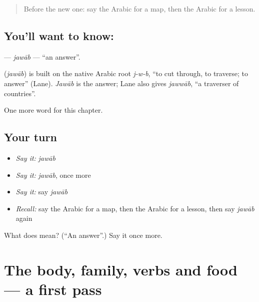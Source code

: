 \label{lesson:AR-C74-jawab}



\begin{quote}
Before the new one: say the Arabic for a map, then the Arabic for a lesson.
\end{quote}

\subsection*{You'll want to know: }
\textbf{} — \emph{jawāb} — \textquotedblleft{}an answer\textquotedblright{}.

\begin{cousinweb}
\textbf{} (\emph{jawāb}) is built on the native Arabic root \emph{j-w-b}, \textquotedblleft{}to cut through, to traverse; to answer\textquotedblright{} (Lane). \emph{Jawāb} is the answer; Lane also gives \emph{jawwāb}, \textquotedblleft{}a traverser of countries\textquotedblright{}.
\end{cousinweb}

\begin{grammarlens}[title={What you've built}]
One more word for this chapter.
\end{grammarlens}

\subsection*{Your turn}
\begin{itemize}
\raggedright
  \item \emph{Say it:} \emph{jawāb}
  \item \emph{Say it:} \emph{jawāb}, once more
  \item \emph{Say it:} say \emph{jawāb}
  \item \emph{Recall:} say the Arabic for a map, then the Arabic for a lesson, then say \emph{jawāb} again
\end{itemize}

\begin{tcolorbox}[breakable,colback=teal!4,colframe=teal!35!black,title={Before you move on}]
What does  mean? (\textquotedblleft{}An answer\textquotedblright{}.) Say it once more.
\end{tcolorbox}
\section[(dialogue)]{The body, family, verbs and food — a first pass}

